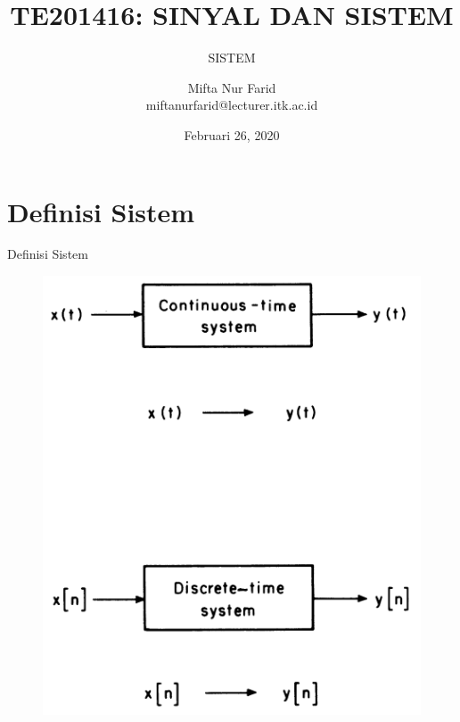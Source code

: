 \documentclass[aspectratio=169]{beamer}
\author{Mifta Nur Farid \\
	miftanurfarid@lecturer.itk.ac.id}
\title{TE201416: SINYAL DAN SISTEM}
\subtitle{SISTEM}
\institute{Teknik Elektro \\ Institut Teknologi Kalimantan \\ Balikpapan, Indonesia}
\date{\tiny Februari 26, 2020}
\begin{document}
\begin{frame}[t,plain]
\titlepage
\end{frame}


\section{Definisi Sistem}
\begin{frame}{Definisi Sistem}
	\begin{figure}
		\centering
		\includegraphics[height=0.8\textheight]{gambar/02.sistem/02.slide_09}
	\end{figure}
\end{frame}
\end{document}
